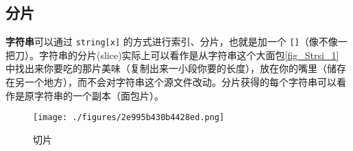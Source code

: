 
\subsection{分片}

\textbf{字符串}可以通过 \verb`string[x]` 的方式进行索引、分片，也就是加一个 \verb`[]`（像不像一把刀）。字符串的分片(slice)实际上可以看作是从字符串这个大面包\autoref{fig_Strsi_1} 中找出来你要吃的那片美味（复制出来一小段你要的长度），放在你的嘴里（储存在另一个地方），而不会对字符串这个源文件改动。分片获得的每个字符串可以看作是原字符串的一个副本（面包片）。
\begin{figure}[ht]
\centering
\texttt{[image: ./figures/2e995b430b4428ed.png]}
\caption{切片} \label{fig_Strsi_1}
\end{figure}

